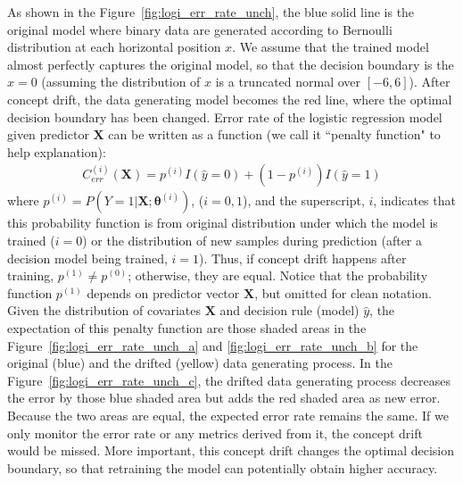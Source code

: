 \documentclass[twoside,11pt]{article}
\begin{document}
As shown in the Figure~\ref{fig:logi_err_rate_unch}, the blue solid line is the original model where binary data are generated according to Bernoulli distribution at each horizontal position $x$. We assume that the trained model almost perfectly captures the original model, so that the decision boundary is the $x=0$ (assuming the distribution of $x$ is a truncated normal over $[-6, 6]$). After concept drift, the data generating model becomes the red line, where the optimal decision boundary has been changed. Error rate of the logistic regression model given predictor $\bm {X}$ can be written as a function (we call it ``penalty function" to help explanation):
\begin{align}
C _{err}^{(i)}(\bm {X}) = p ^{(i)}I(\hat{y}=0)+(1-p ^{(i)})I(\hat{y}=1)
\label{eqn:penal_err}
\end{align}
where $p ^{(i)} = P(Y=1|\bm {X}; \bm { \theta} ^{(i)})$, ($i=0,1$), and the superscript, $i$, indicates that this probability function is from original distribution under which the model is trained ($i=0$) or the distribution of new samples during prediction (after a decision model being trained, $i=1$). Thus, if concept drift happens after training, $p ^{(1)} \neq p ^{(0)}$; otherwise, they are equal. Notice that the probability function $p ^{(1)}$ depends on predictor vector $\bm {X}$, but omitted for clean notation. Given the distribution of covariates $\bm {X}$ and decision rule (model) $\hat{y}$, the expectation of this penalty function are those shaded areas in the Figure~\ref{fig:logi_err_rate_unch_a} and \ref{fig:logi_err_rate_unch_b} for the original (blue) and the drifted (yellow) data generating process. In the Figure~\ref{fig:logi_err_rate_unch_c}, the drifted data generating process decreases the error by those blue shaded area but adds the red shaded area as new error. Because the two areas are equal, the expected error rate remains the same. If we only monitor the error rate or any metrics derived from it, the concept drift would be missed. More important, this concept drift changes the optimal decision boundary, so that retraining the model can potentially obtain higher accuracy. 
\end{document}

